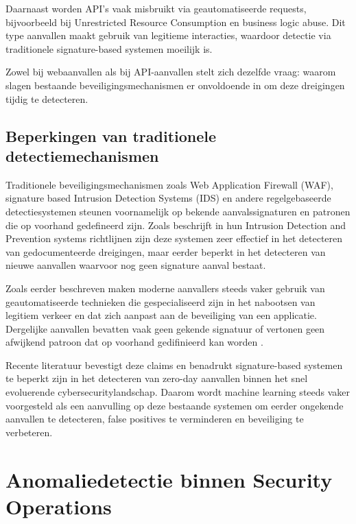 Daarnaast worden API’s vaak misbruikt via geautomatiseerde requests, bijvoorbeeld bij Unrestricted Resource Consumption en business logic abuse. Dit type aanvallen maakt gebruik van legitieme interacties, waardoor detectie via traditionele signature-based systemen moeilijk is\autocite{OWASP2023}.%

Zowel bij webaanvallen als bij API-aanvallen stelt zich dezelfde vraag: waarom slagen bestaande beveiligingsmechanismen er onvoldoende in om deze dreigingen tijdig te detecteren. 

\subsection{Beperkingen van traditionele detectiemechanismen}
\label{subsec:traditioneel-beperkingen}

Traditionele beveiligingsmechanismen zoals Web Application Firewall (WAF), signature based Intrusion Detection Systems (IDS) en andere regelgebaseerde detectiesystemen steunen voornamelijk op bekende aanvalssignaturen en patronen die op voorhand gedefineerd zijn. Zoals \textcite{Standards2007} beschrijft in hun Intrusion Detection and Prevention systems richtlijnen zijn deze systemen zeer effectief in het detecteren van gedocumenteerde dreigingen, maar eerder beperkt in het detecteren van nieuwe aanvallen waarvoor nog geen signature aanval bestaat. 

Zoals eerder beschreven maken moderne aanvallers steeds vaker gebruik van geautomatiseerde technieken die gespecialiseerd zijn in het nabootsen van legitiem verkeer en dat zich aanpast aan de beveiliging van een applicatie. Dergelijke aanvallen bevatten vaak geen gekende signatuur of vertonen geen afwijkend patroon dat op voorhand gedifinieerd kan worden \autocite{F52026}.

Recente literatuur bevestigt deze claims en benadrukt signature-based systemen te beperkt zijn in het detecteren van zero-day aanvallen binnen het snel evoluerende cybersecuritylandschap. Daarom wordt machine learning steeds vaker voorgesteld als een aanvulling op deze bestaande systemen om eerder ongekende aanvallen te detecteren, false positives te verminderen en beveiliging te verbeteren\autocite{Kumar_2025}. %


\section{Anomaliedetectie binnen Security Operations}
\label{sec:anomaliedetectie-soc}

